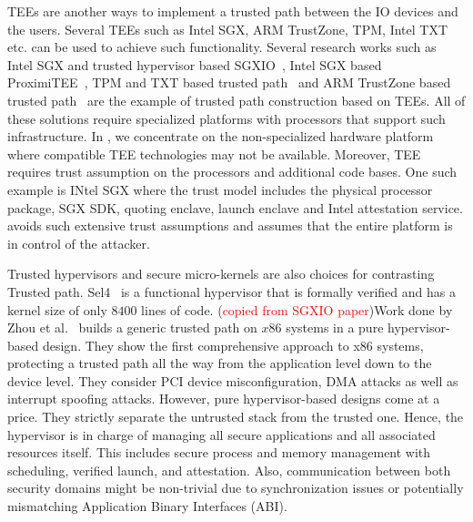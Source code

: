  TEEs are another ways to implement a trusted path between the IO devices and the users. Several TEEs such as Intel SGX, ARM TrustZone, TPM, Intel TXT etc. can be used to achieve such functionality. Several research works such as Intel SGX and trusted hypervisor based SGXIO~\cite{weiser2017sgxio}, Intel SGX based ProximiTEE~\cite{dhar2018proximitee}, TPM and TXT based trusted path~\cite{filyanov2011uni} and ARM TrustZone based trusted path~\cite{filyanov2011uni,sun2015trustotp} are the example of trusted path construction based on TEEs. All of these solutions require specialized platforms with processors that support such infrastructure. In \name, we concentrate on the non-specialized hardware platform where compatible TEE technologies may not be available.
Moreover, TEE requires trust assumption on the processors and additional code bases. One such example is INtel SGX where the trust model includes the physical processor package, SGX SDK, quoting enclave, launch enclave and Intel attestation service. \name avoids such extensive trust assumptions and assumes that the entire platform is in control of the attacker.

 Trusted hypervisors and secure micro-kernels are also choices for contrasting Trusted path. Sel4~\cite{klein2009sel4} is a functional hypervisor that is formally verified and has a kernel size of only $8400$ lines of code. (\textcolor{red}{copied from SGXIO paper})Work done by Zhou et al.~\cite{zhou2012building} builds a generic trusted path on $x86$ systems in a pure hypervisor-based design. They show the first comprehensive approach to x86 systems, protecting a trusted path all the way from the application level down to the device level.  They consider PCI device misconfiguration, DMA attacks as well as interrupt spoofing attacks.  However, pure hypervisor-based designs come at a price.  They strictly separate the untrusted stack from the trusted one.  Hence, the hypervisor is in charge of managing all secure applications and all associated resources itself.  This includes secure process and memory management with scheduling, verified launch, and attestation.  Also, communication between both security domains might be non-trivial due to synchronization issues or potentially mismatching Application Binary Interfaces (ABI).

